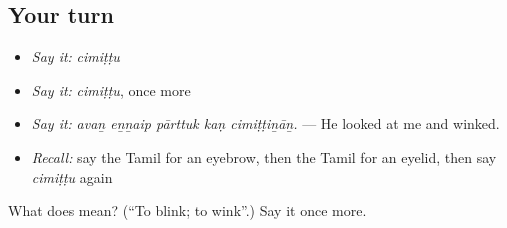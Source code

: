 \subsection*{Your turn}
\begin{itemize}
\raggedright
  \item \emph{Say it:} \emph{cimiṭṭu}
  \item \emph{Say it:} \emph{cimiṭṭu}, once more
  \item \emph{Say it:} \emph{avaṉ eṉṉaip pārttuk kaṇ cimiṭṭiṉāṉ.} — He looked at me and winked.
  \item \emph{Recall:} say the Tamil for an eyebrow, then the Tamil for an eyelid, then say \emph{cimiṭṭu} again
\end{itemize}

\begin{tcolorbox}[breakable,colback=teal!4,colframe=teal!35!black,title={Before you move on}]
What does  mean? (\textquotedblleft{}To blink; to wink\textquotedblright{}.) Say it once more.
\end{tcolorbox}
